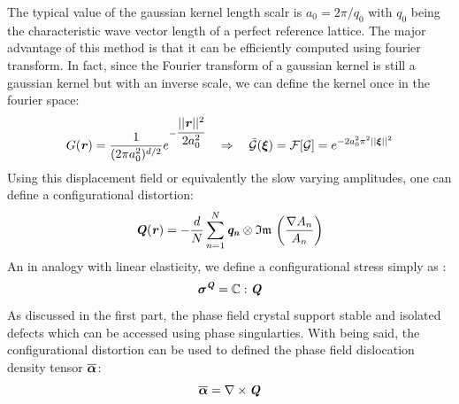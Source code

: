 \documentclass{article}
\begin{document}
The typical value of the gaussian kernel length scalr is $a_0=2\pi/q_0$ with $q_0$ being the characteristic wave vector length of a perfect reference lattice. The major advantage of this method is that it can be efficiently computed using fourier transform. In fact, since the Fourier transform of a gaussian kernel is still a gaussian kernel but with an inverse scale, we can define the kernel once in the fourier space:
\begin{equation}
   G(\bm{\mathit{r}}) = \frac{1}{(2\pi a_0^2)^{d/2}} e^{-\cfrac{||\bm{\mathit{r}}||^2}{2a_0^2}} \quad \Rightarrow \quad \tilde{\mathcal{G}} (\bm{\mathit{\xi}})= \mathcal{F}[\mathcal{G}] = e^{-2a_0^2\pi^2||\bm{\mathit{\xi}}||^2}
\end{equation}
Using this displacement field or equivalently the slow varying amplitudes, one can define a configurational distortion:
\begin{equation}
   \bm{\mathit{Q}}(\bm{\mathit{r}}) = -\frac{d}{N} \sum_{n=1}^{N} \bm{\mathit{q_n}} \otimes \operatorname{\mathfrak{Im}}\, \left(\frac{\nabla A_n}{A_n}\right)
\end{equation}
An in analogy with linear elasticity, we define a configurational stress simply as : 
\begin{equation}
   \bm{\mathit{\sigma}}^{\bm{\mathit{Q}}} = \mathbb{C}:\bm{\mathit{Q}}
\end{equation}
As discussed in the first part, the phase field crystal support stable and isolated defects which can be accessed using phase singularties. With being said, the configurational distortion can be used to defined the phase field dislocation density tensor $\overline{\bm{\mathit{\alpha}}}$:
 \begin{equation}\label{eq:uncoupledalpha}
   \overline{\bm{\mathit{\alpha}}} = \nabla \times \bm{\mathit{Q}}
 \end{equation}
\end{document}
